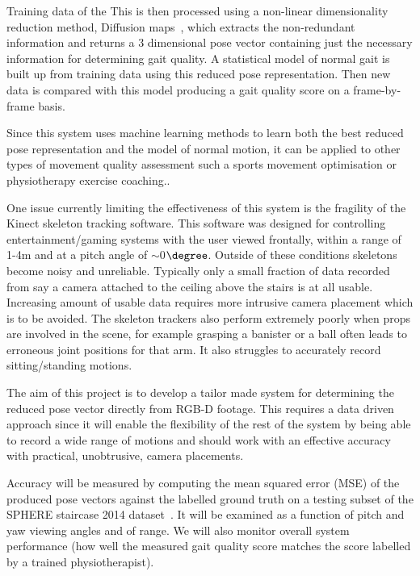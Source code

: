 \documentclass[11pt]{article} %
\begin{document}
Training data of the This is then processed using a non-linear dimensionality reduction method, Diffusion maps~\cite{Coifman2006}, which extracts the non-redundant information and returns a 3 dimensional pose vector containing just the necessary information for determining gait quality. A statistical model of normal gait is built up from training data using this reduced pose representation. Then new data is compared with this model producing a gait quality score on a frame-by-frame basis.

Since this system uses machine learning methods to learn both the best reduced pose representation and the model of normal motion, it can be applied to other types of movement quality assessment such a sports movement optimisation or physiotherapy exercise coaching..

One issue currently limiting the effectiveness of this system is the fragility of the Kinect skeleton tracking software. This software was designed for controlling entertainment/gaming systems with the user viewed frontally, within a range of 1-4m and at a pitch angle of $\sim$0$\degree$. Outside of these conditions skeletons become noisy and unreliable. Typically only a small fraction of data recorded from say a camera attached to the ceiling above the stairs is at all usable. Increasing amount of usable data requires more intrusive camera placement which is to be avoided. The skeleton trackers also perform extremely poorly when props are involved in the scene, for example grasping a banister or a ball often leads to erroneous joint positions for that arm. It also struggles to accurately record sitting/standing motions.

The aim of this project is to develop a tailor made system for determining the reduced pose vector directly from RGB-D footage. This requires a data driven approach since 
 it will enable the flexibility of the rest of the system by being able to record a wide range of motions and should work with an effective accuracy with practical, unobtrusive, camera placements.

 Accuracy will be measured by computing the mean squared error (MSE) of the produced pose vectors against the labelled ground truth on a testing subset of the SPHERE staircase 2014 dataset~\cite{Paiement}. It will be examined as a function of pitch and yaw viewing angles and of range. We will also monitor overall system performance (how well the measured gait quality score matches the score labelled by a trained physiotherapist). 
\end{document}
